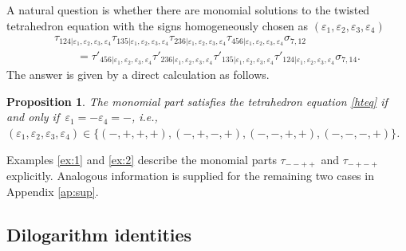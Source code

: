 \documentclass[11pt]{article}
\numberwithin{equation}{section}
\numberwithin{equation}{section}
\newtheorem{Proposition}[Theorem]{Proposition}
 { \theoremstyle{definition}
\newtheorem{Example}[Theorem]{Example}
\newtheorem{Remark}[Theorem]{Remark} }
\begin{document}
A natural question is whether there are monomial solutions to the twisted tetrahedron equation
with the signs homogeneously chosen as $(\varepsilon_1,\varepsilon_2,\varepsilon_3,\varepsilon_4)$
\begin{gather}
\tau_{124| \varepsilon_1,\varepsilon_2,\varepsilon_3,\varepsilon_4}
\tau_{135| \varepsilon_1,\varepsilon_2,\varepsilon_3,\varepsilon_4}
\tau_{236| \varepsilon_1,\varepsilon_2,\varepsilon_3,\varepsilon_4}
\tau_{456| \varepsilon_1,\varepsilon_2,\varepsilon_3,\varepsilon_4} \sigma_{7,12}\nonumber
\\
\qquad=
\tau'_{456| \varepsilon_1,\varepsilon_2,\varepsilon_3,\varepsilon_4}
\tau'_{236| \varepsilon_1,\varepsilon_2,\varepsilon_3,\varepsilon_4}
\tau'_{135| \varepsilon_1,\varepsilon_2,\varepsilon_3,\varepsilon_4}
\tau'_{124| \varepsilon_1,\varepsilon_2,\varepsilon_3,\varepsilon_4}\sigma_{7,14}.\label{hteq}
\end{gather}
The answer is given by a direct calculation as follows.
\begin{Proposition} \label{pr:mono}
The monomial part
satisfies the tetrahedron equation \eqref{hteq}
if and only if~${\varepsilon_1=-\varepsilon_4 = -}$, i.e.,
$(\varepsilon_1,\varepsilon_2,\varepsilon_3,\varepsilon_4) \in
\{(-,+,+,+), (-,+,-,+), (-,-,+,+), (-,-,-,+)\}$.
\end{Proposition}
Examples \ref{ex:1} and \ref{ex:2} describe the monomial parts
$\tau_{--++}$ and $\tau_{-+-+}$ explicitly.
Analogous information is supplied for the remaining two cases in Appendix \ref{ap:sup}.

\subsection{Dilogarithm identities}\label{ss:did}
\end{document}
